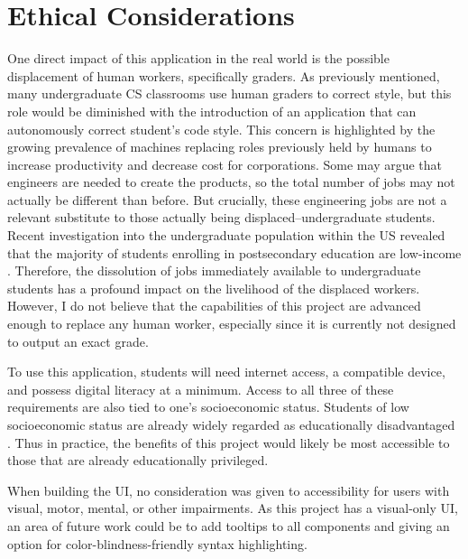 \documentclass[10pt,twocolumn]{article}
\begin{document}
\section{Ethical Considerations}
One direct impact of this application in the real world is the possible displacement of human workers, specifically graders. 
As previously mentioned, many undergraduate CS classrooms use human graders to correct style, but this role would be diminished with the introduction of an application that can autonomously correct student's code style. 
This concern is highlighted by the growing prevalence of machines replacing roles previously held by humans to increase productivity and decrease cost for corporations. 
Some may argue that engineers are needed to create the products, so the total number of jobs may not actually be different than before. 
But crucially, these engineering jobs are not a relevant substitute to those actually being displaced--undergraduate students. 
Recent investigation into the undergraduate population within the US revealed that the majority of students enrolling in postsecondary education are low-income \cite{fountain_2019}. Therefore, the dissolution of jobs immediately available to undergraduate students has a profound impact on the livelihood of the displaced workers. 
However, I do not believe that the capabilities of this project are advanced enough to replace any human worker, especially since it is currently not designed to output an exact grade. 

To use this application, students will need internet access, a compatible device, and possess digital literacy at a minimum. 
Access to all three of these requirements are also tied to one's socioeconomic status. 
Students of low socioeconomic status are already widely regarded as educationally disadvantaged \cite{walpole_2003}. 
Thus in practice, the benefits of this project would likely be most accessible to those that are already educationally privileged.  

When building the UI, no consideration was given to accessibility for users with visual, motor, mental, or other impairments. 
As this project has a visual-only UI, an area of future work could be to add tooltips to all components and giving an option for color-blindness-friendly syntax highlighting. 

\printbibliography 
\end{document}

